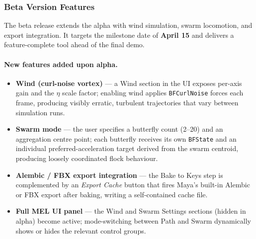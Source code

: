 \documentclass[12pt]{article}
\begin{document}
\subsubsection{Beta Version Features}

The beta release extends the alpha with wind simulation, swarm locomotion, and
export integration. It targets the milestone date of \textbf{April 15} and
delivers a feature-complete tool ahead of the final demo.

\paragraph{New features added upon alpha.}
\begin{itemize}
  \item \textbf{Wind (curl-noise vortex)} --- a Wind section in the UI exposes
    per-axis gain and the $\eta$ scale factor; enabling wind applies
    \texttt{BFCurlNoise} forces each frame, producing visibly erratic, turbulent
    trajectories that vary between simulation runs.
  \item \textbf{Swarm mode} --- the user specifies a butterfly count (2--20) and
    an aggregation centre point; each butterfly receives its own \texttt{BFState}
    and an individual preferred-acceleration target derived from the swarm
    centroid, producing loosely coordinated flock behaviour.
  \item \textbf{Alembic / FBX export integration} --- the Bake to Keys step is
    complemented by an \textit{Export Cache} button that fires Maya's built-in
    Alembic or FBX export after baking, writing a self-contained cache file.
  \item \textbf{Full MEL UI panel} --- the Wind and Swarm Settings
    sections (hidden in alpha) become active; mode-switching between Path and Swarm
    dynamically shows or hides the relevant control groups.
\end{itemize}
\end{document}
